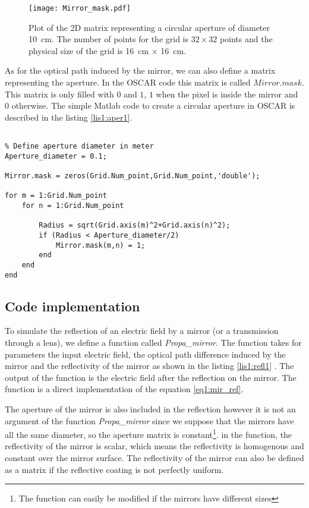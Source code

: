 
\begin{figure}
\begin{center}
\texttt{[image: Mirror\_mask.pdf]}
\end{center}
\caption{\label{fig1:aperture} Plot of the 2D matrix representing a circular aperture of diameter 10~cm. The number of points for the grid is $32 \times 32$ points and the physical size of the grid is 16~cm $\times$ 16~cm.}
\end{figure}

As for the optical path induced by the mirror, we can also define a matrix representing the aperture. In the OSCAR code this matrix is called $Mirror.mask$. This matrix is only filled with $0$ and $1$, $1$ when the pixel is inside the mirror and $0$ otherwise. The simple Matlab code to create a circular aperture in OSCAR is described in the listing \ref{lis1:aper1}.\\

\begin{lstlisting}[float=htp,caption=The code used to create a circular aperture \label{lis1:aper1},frame=lines]

% Define aperture diameter in meter
Aperture_diameter = 0.1;

Mirror.mask = zeros(Grid.Num_point,Grid.Num_point,'double');

for m = 1:Grid.Num_point
    for n = 1:Grid.Num_point

        Radius = sqrt(Grid.axis(m)^2+Grid.axis(n)^2);
        if (Radius < Aperture_diameter/2)
            Mirror.mask(m,n) = 1;
        end
    end
end

\end{lstlisting}

\subsection{Code implementation}
\label{sec1:3:5}
To simulate the reflection of an electric field by a mirror (or a transmission through a lens), we define a function called \emph{Propa\_mirror}. The function takes for parameters the input electric field, the optical path difference induced by the mirror and the reflectivity of the mirror as shown in the listing \ref{lis1:refl1} . The output of the function is the electric field after the reflection on the mirror. The function is a direct implementation of the equation \ref{eq1:mir_ref}.

The aperture of the mirror is also included in the reflection however it is not an argument of the function \emph{Propa\_mirror} since we suppose that the mirrors have all the same diameter, so the aperture matrix is constant\footnote{The function can easily be modified if the mirrors have different sizes}. in the function, the reflectivity of the mirror is scalar, which means the reflectivity is homogenous and constant over the mirror surface. The reflectivity of the mirror can also be defined as a matrix if the reflective coating is not perfectly uniform.

